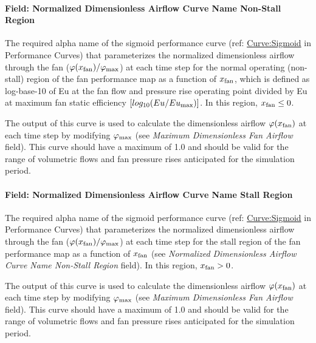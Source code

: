 \paragraph{Field: Normalized Dimensionless Airflow Curve Name Non-Stall Region}\label{field-normalized-dimensionless-airflow-curve-name-non-stall-region}

The required alpha name of the sigmoid performance curve (ref: \hyperref[curvesigmoid]{Curve:Sigmoid} in Performance Curves) that parameterizes the normalized dimensionless airflow through the fan (\(\varphi (x_{\rm{fan}}) / \varphi_{\rm{max}}\)) at each time step for the normal operating (non-stall) region of the fan performance map as a function of \(x_{\rm{fan}}\), which is defined as log-base-10 of Eu at the fan flow and pressure rise operating point divided by Eu at maximum fan static efficiency \([log_{10}(Eu / Eu_{\rm{max}})]\). In this region, \(x_{\rm{fan}} \le 0\).

The output of this curve is used to calculate the dimensionless airflow \(\varphi (x_{\rm{fan}})\) at each time step by modifying \(\varphi_{\rm{max}}\) (see \emph{Maximum Dimensionless Fan Airflow} field). This curve should have a maximum of 1.0 and should be valid for the range of volumetric flows and fan pressure rises anticipated for the simulation period.

\paragraph{Field: Normalized Dimensionless Airflow Curve Name Stall Region}\label{field-normalized-dimensionless-airflow-curve-name-stall-region}

The required alpha name of the sigmoid performance curve (ref: \hyperref[curvesigmoid]{Curve:Sigmoid} in Performance Curves) that parameterizes the normalized dimensionless airflow through the fan (\(\varphi (x_{\rm{fan}}) / \varphi_{\rm{max}}\)) at each time step for the stall region of the fan performance map as a function of \(x_{\rm{fan}}\) (see \emph{Normalized Dimensionless Airflow Curve Name Non-Stall Region} field). In this region, \(x_{\rm{fan}} > 0\).

The output of this curve is used to calculate the dimensionless airflow \(\varphi (x_{\rm{fan}})\) at each time step by modifying \(\varphi_{\rm{max}}\) (see \emph{Maximum Dimensionless Fan Airflow} field). This curve should have a maximum of 1.0 and should be valid for the range of volumetric flows and fan pressure rises anticipated for the simulation period.


